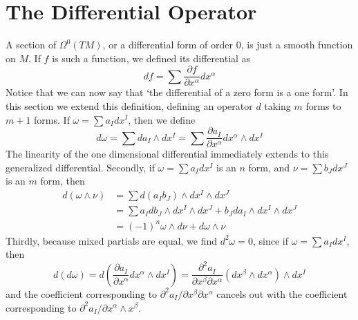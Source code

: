 \section{The Differential Operator}

A section of $\Omega^0(TM)$, or a differential form of order 0, is just a smooth function on $M$. If $f$ is such a function, we defined its differential as
%
\[ df = \sum \frac{\partial f}{\partial x^\alpha} dx^\alpha \]
%
Notice that we can now say that `the differential of a zero form is a one form'. In this section we extend this definition, defining an operator $d$ taking $m$ forms to $m+1$ forms. If $\omega = \sum a_I dx^I$, then we define
%
\[ d\omega = \sum da_I \wedge dx^I = \sum \frac{\partial a_I}{\partial x^\alpha} dx^\alpha \wedge dx^I \]
%
The linearity of the one dimensional differential immediately extends to this generalized differential. Secondly, if $\omega = \sum a_I dx^I$ is an $n$ form, and $\nu = \sum b_J dx^J$ is an $m$ form, then
%
\begin{align*}
    d(\omega \wedge \nu) &= \sum d(a_Ib_J) \wedge dx^I \wedge dx^J\\
    &= \sum a_I db_J \wedge dx^I \wedge dx^J + b_J da_I \wedge dx^I \wedge dx^J\\
    &= (-1)^n \omega \wedge d\nu + d\omega \wedge \nu
\end{align*}
%
Thirdly, because mixed partials are equal, we find $d^2 \omega = 0$, since if $\omega = \sum a_I dx^I$, then
%
\[ d(d\omega) = d \left( \frac{\partial a_I}{\partial x^\alpha} dx^\alpha \wedge dx^I \right) = \frac{\partial^2 a_I}{\partial x^\beta \partial x^\alpha} (dx^\beta \wedge dx^\alpha) \wedge dx^I \]
%
and the coefficient corresponding to $\partial^2 a_I/\partial x^\beta \partial x^\alpha$ cancels out with the coefficient corresponding to $\partial^2 a_I/\partial x^\alpha \wedge x^\beta$.

